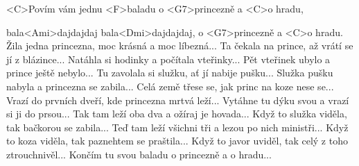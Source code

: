 
\zs
<C>Povím vám jednu <F>baladu o <G7>princezně a <C>o hradu,

bala<Ami>dajdajdaj bala<Dmi>dajdajdaj, o <G7>princezně a <C>o hradu.
\ks
\zs
Žila jedna princezna, moc krásná a moc líbezná...
\ks
\zs
Ta čekala na prince, až vrátí se jí z blázince...
\ks
\zs
Natáhla si hodinky a počítala vteřinky...
\ks
\zs
Pět vteřinek ubylo a prince ještě nebylo...
\ks
\zs
Tu zavolala si služku, ať jí nabije pušku...
\ks
\zs
Služka pušku nabyla a princezna se zabila...
\ks
\zs
Celá země třese se, jak princ na koze nese se...
\ks
\zs
Vrazí do prvních dveří, kde princezna mrtvá leží...
\ks
\zs
Vytáhne tu dýku svou a vrazí si ji do prsou...
\ks
\zs
Tak tam leží oba dva a ožíraj je hovada...
\ks
\zs
Když to služka viděla, tak bačkorou se zabila...
\ks
\zs
Teď tam leží všichni tři a lezou po nich ministři...
\ks
\zs
Když to koza viděla, tak paznehtem se praštila...
\ks
\zs
Když to javor uviděl, tak celý z toho ztrouchnivěl...
\ks
\zs
Končím tu svou baladu o princezně a o hradu...
\ks

\kp























